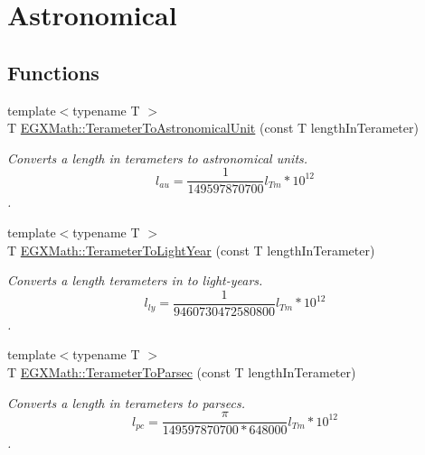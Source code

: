 \hypertarget{group___e_g_x_math-_conversions-_length_conversions-_terameter-_astronomical}{}\section{Astronomical}
\label{group___e_g_x_math-_conversions-_length_conversions-_terameter-_astronomical}
\subsection*{Functions}
\begin{DoxyCompactItemize}
\item 
{\footnotesize template$<$typename T $>$ }\\T \mbox{\hyperlink{group___e_g_x_math-_conversions-_length_conversions-_terameter-_astronomical_gaddabc91d53862a8031cd5438aedb0ed2}{E\+G\+X\+Math\+::\+Terameter\+To\+Astronomical\+Unit}} (const T length\+In\+Terameter)
\begin{DoxyCompactList}\small\item\em Converts a length in terameters to astronomical units. \[ l_{au}= \frac{1}{149597870700} l_{Tm} * 10^{12} \]. \end{DoxyCompactList}\item 
{\footnotesize template$<$typename T $>$ }\\T \mbox{\hyperlink{group___e_g_x_math-_conversions-_length_conversions-_terameter-_astronomical_gaf8f6953b6ef57246e02ab136d74ee7a8}{E\+G\+X\+Math\+::\+Terameter\+To\+Light\+Year}} (const T length\+In\+Terameter)
\begin{DoxyCompactList}\small\item\em Converts a length terameters in to light-\/years. \[ l_{ly}= \frac{1}{9460730472580800} l_{Tm} * 10^{12} \]. \end{DoxyCompactList}\item 
{\footnotesize template$<$typename T $>$ }\\T \mbox{\hyperlink{group___e_g_x_math-_conversions-_length_conversions-_terameter-_astronomical_gac203b94b19db6ed8181e78413fafcf58}{E\+G\+X\+Math\+::\+Terameter\+To\+Parsec}} (const T length\+In\+Terameter)
\begin{DoxyCompactList}\small\item\em Converts a length in terameters to parsecs. \[ l_{pc}=\frac{\pi}{149597870700 * 648000} l_{Tm} * 10^{12} \]. \end{DoxyCompactList}\end{DoxyCompactItemize}


